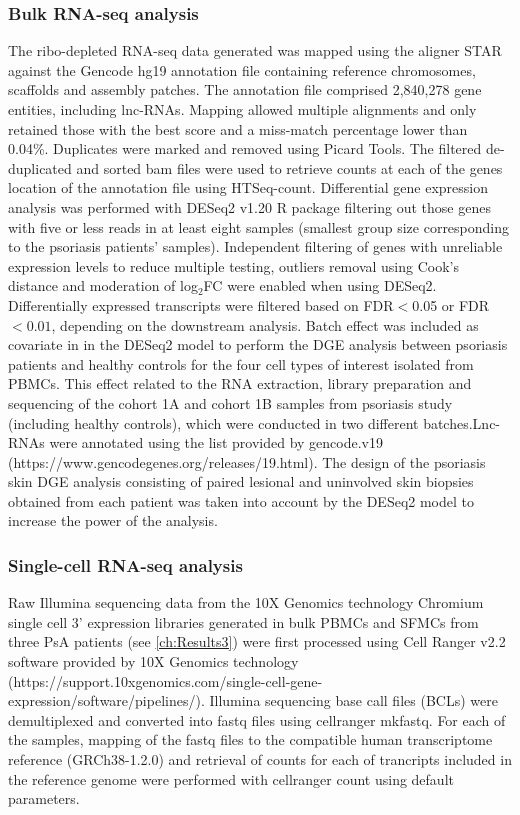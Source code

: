 \subsubsection{Bulk RNA-seq analysis}
The ribo-depleted RNA-seq data generated was mapped using the aligner STAR \parencite{Dobin2013} against the Gencode hg19 annotation file containing reference chromosomes, scaffolds and assembly patches. The annotation file comprised 2,840,278 gene entities, including lnc-RNAs. Mapping allowed multiple alignments and only retained those with the best score and a miss-match percentage lower than 0.04\%. Duplicates were marked and removed using Picard Tools. The filtered de-duplicated and sorted bam files were used to retrieve counts at each of the genes location of the annotation file using HTSeq-count. Differential gene expression analysis was performed with DESeq2 v1.20 R package filtering out those genes with five or less reads in at least eight samples (smallest group size corresponding to the psoriasis patients' samples). Independent filtering of genes with unreliable expression levels to reduce multiple testing, outliers removal using Cook's distance and moderation of log$_2$FC were enabled when using DESeq2. Differentially expressed transcripts were filtered based on FDR$<$0.05 or FDR$<0.01$, depending on the downstream analysis. Batch effect was included as covariate in in the DESeq2 model to perform the DGE analysis between psoriasis patients and healthy controls for the four cell types of interest isolated from PBMCs. This effect related to the RNA extraction, library preparation and sequencing of the cohort 1A and cohort 1B samples from psoriasis study (including healthy controls), which were conducted in two different batches.Lnc-RNAs were annotated using the list provided by gencode.v19 (https://www.gencodegenes.org/releases/19.html). The design of the psoriasis skin DGE analysis consisting of paired lesional and uninvolved skin biopsies obtained from each patient was taken into account by the DESeq2 model to increase the power of the analysis.



\subsubsection{Single-cell RNA-seq analysis}
Raw Illumina sequencing data from the 10X Genomics technology Chromium single cell 3' expression libraries generated in bulk PBMCs and SFMCs from three PsA patients (see \ref{ch:Results3}) were first processed using Cell Ranger v2.2 software provided by 10X Genomics technology (https://support.10xgenomics.com/single-cell-gene-expression/software/pipelines/). Illumina sequencing base call files (BCLs) were demultiplexed and converted into fastq files using cellranger mkfastq. For each of the samples, mapping of the fastq files to the compatible human transcriptome reference (GRCh38-1.2.0) and retrieval of counts for each of trancripts included in the reference genome were performed with cellranger count using default parameters. 

